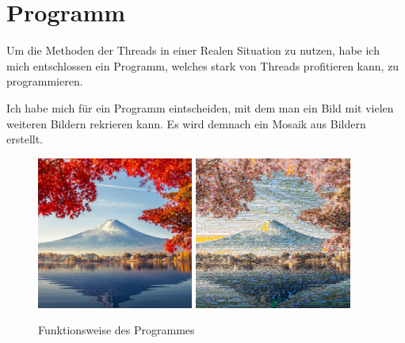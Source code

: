 \section*{Programm}
Um die Methoden der Threads in einer Realen Situation zu nutzen, habe ich mich entschlossen ein Programm, welches stark von Threads profitieren kann, zu programmieren.  

Ich habe mich für ein Programm eintscheiden, mit dem man ein Bild mit vielen weiteren Bildern rekrieren kann. Es wird demnach ein Mosaik aus Bildern erstellt.

\begin{figure}[h]
    \centering
    \includegraphics[height=5cm]{images/Source_100x100}
    \includegraphics[height=5cm]{images/Render_100x100}
    \caption[Programm Funktion]{Funktionsweise des Programmes}
\end{figure}